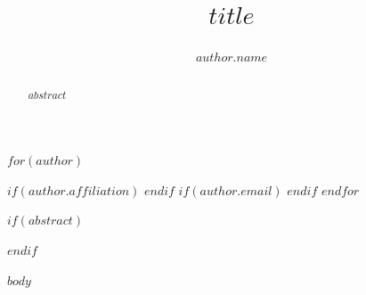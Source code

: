 \documentclass[sigconf$if(anonymous)$,anonymous,review$endif$]{acmart}
\begin{document}
\title{$title$}
$for(author)$
\author{$author.name$}
$if(author.affiliation)$
$endif$
$if(author.email)$
$endif$
$endfor$

$if(abstract)$
\begin{abstract}
$abstract$
\end{abstract}
$endif$

\maketitle
\pagestyle{plain}

$body$
\end{document}
